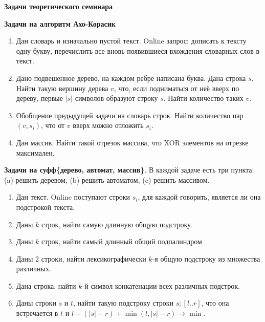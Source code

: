 \documentclass[12pt,a4paper,oneside]{article}
\begin{document}
\newenvironment{MyList}{
  \begin{enumerate}
  \setlength{\parskip}{-5pt}
  \setlength{\itemsep}{5pt}
}{
  \setlength{\parskip}{0pt}
  \end{enumerate}
}

\newenvironment{MyItemize}{
  \begin{itemize}
  \setlength{\parskip}{-5pt}
  \setlength{\itemsep}{5pt}
}{
  \setlength{\parskip}{0pt}
  \end{itemize}
}

\vspace*{0em}
\centerline{\Large\bf Задачи теоретического семинара}

\bigskip

{\bf Задачи на алгоритм Ахо-Корасик}

\begin{MyList}
  \item Дан словарь и изначально пустой текст. Online запрос: дописать к тексту одну букву, перечислить все вновь появившиеся вхождения словарных слов в текст.
  \item Дано подвешенное дерево, на каждом ребре написана буква. Дана строка $s$. Найти такую вершину дерева $v$, что, если подниматься от неё вверх по дереву,
    первые $|s|$ символов образуют строку $s$. Найти количество таких $v$.
  \item Обобщение предыдущей задачи на словарь строк. Найти количество пар $(v, s_i)$, что от $v$ вверх можно отложить $s_i$.
  \item Дан массив. Найти такой отрезок массива, что XOR элементов на отрезке максимален.
\end{MyList}

{\bf Задачи на суфф\{дерево, автомат, массив\}}. В каждой задаче есть три пункта:
(a) решить деревом, (b) решить автоматом, (c) решить массивом.

\begin{MyList}
  \setcounter{enumi}{4}
  \item Дан текст. Online поступают строки $s_i$, для каждой говорить, является ли она подстрокой текста.
  \item Даны $k$ строк, найти самую длинную общую подстроку.
  \item Даны $k$ строк, найти самый длинный общий подпалиндром
  \item Даны 2 строки, найти лексикографически $k$-я общую подстроку из множества различных.
  \item Дана строка, найти $k$-й символ конкатенации всех различных подстрок.
  \item Даны строки $s$ и $t$, найти такую подстроку строки $s \colon [l..r]$, что она встречается в $t$ и $l + (|s| - r) + \min(l, |s| - r) \rightarrow \min$.
\end{MyList}
\end{document}
